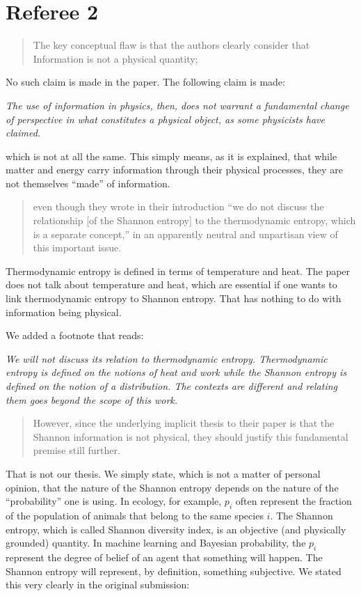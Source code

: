 \documentclass[11pt]{article}
\begin{document}
\section*{Referee 2}

\begin{quote}
	The key conceptual flaw is that the authors clearly consider that Information is not a physical quantity;
\end{quote}

No such claim is made in the paper. The following claim is made:

\emph{The use of information in physics, then, does not warrant a fundamental change of perspective in what constitutes a physical object, as some physicists have claimed.}

\noindent which is not at all the same. This simply means, as it is explained, that while matter and energy carry information through their physical processes, they are not themselves ``made'' of information.

\begin{quote}
	even though they wrote in their introduction “we do not discuss the relationship [of the Shannon entropy] to the thermodynamic entropy, which is a separate concept,” in an apparently neutral and unpartisan view of this important issue.
\end{quote}
Thermodynamic entropy is defined in terms of temperature and heat. The paper does not talk about temperature and heat, which are essential if one wants to link thermodynamic entropy to Shannon entropy. That has nothing to do with information being physical.

We added a footnote that reads:

\emph{We will not discuss its relation to thermodynamic entropy. Thermodynamic entropy is defined on the notions of heat and work while the Shannon entropy is defined on the notion of a distribution. The contexts are different and relating them goes beyond the scope of this work.}

\begin{quote}
However, since the underlying implicit thesis to their paper is that the Shannon information is not physical, they should justify this fundamental premise still further.
\end{quote}
That is not our thesis. We simply state, which is not a matter of personal opinion, that the nature of the Shannon entropy depends on the nature of the ``probability'' one is using. In ecology, for example, $p_i$ often represent the fraction of the population of animals that belong to the same species $i$. The Shannon entropy, which is called Shannon diversity index, is an objective (and physically grounded) quantity. In machine learning and Bayesian probability, the $p_i$ represent the degree of belief of an agent that something will happen. The Shannon entropy will represent, by definition, something subjective. We stated this very clearly in the original submission:
\end{document}
